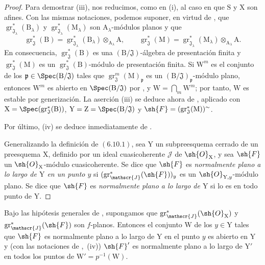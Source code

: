 \begin{proof}
Para demostrar (iii), nos reducimos, como en (i), al caso en que $\mathrm{S}$ y $\mathrm{X}$ son afines. Con las mismas notaciones, podemos suponer, en virtud de , que $\operatorname{gr}^*_{\mathfrak{J}_\lambda}(\mathrm{B}_\lambda)$ y $\operatorname{gr}^*_{\mathfrak{J}_\lambda}(\mathrm{M}_\lambda)$ son $\mathrm{A}_\lambda$-módulos planos y que
\[
\operatorname{gr}^*_\mathfrak{J}(\mathrm{B})
=\operatorname{gr}^*_{\mathfrak{J}_\lambda}(\mathrm{B}_\lambda)\otimes_{\mathrm{A}_\lambda}\mathrm{A},
\qquad
\operatorname{gr}^*_\mathfrak{J}(\mathrm{M})
=\operatorname{gr}^*_{\mathfrak{J}_\lambda}(\mathrm{M}_\lambda)\otimes_{\mathrm{A}_\lambda}\mathrm{A}.
\]
En consecuencia, $\operatorname{gr}^*_\mathfrak{J}(\mathrm{B})$ es una $(\mathrm{B}/\mathfrak{J})$-álgebra de presentación finita y $\operatorname{gr}^*_\mathfrak{J}(\mathrm{M})$ es un $\operatorname{gr}^*_\mathfrak{J}(\mathrm{B})$-módulo de presentación finita. Si $\mathrm{W}^m$ es el conjunto de los $\mathfrak{p}\in\Spec(\mathrm{B}/\mathfrak{J})$ tales que $\operatorname{gr}^m_\mathfrak{J}(\mathrm{M})_{\mathfrak{p}}$ es un $(\mathrm{B}/\mathfrak{J})_{\mathfrak{p}}$-módulo plano, entonces $\mathrm{W}^m$ es abierto en $\Spec(\mathrm{B}/\mathfrak{J})$ por , y $\mathrm{W}=\bigcap_m\mathrm{W}^m$; por tanto, $\mathrm{W}$ es estable por generización. La aserción (iii) se deduce ahora de , aplicado con $\mathrm{X}=\Spec(\operatorname{gr}^*_\mathfrak{J}(\mathrm{B}))$, $\mathrm{Y}=\mathrm{Z}=\Spec(\mathrm{B}/\mathfrak{J})$ y $\sh{F}=(\operatorname{gr}^*_\mathfrak{J}(\mathrm{M}))^\sim$.

Por último, (iv) se deduce inmediatamente de .

Generalizando la definición de $(6.10.1)$, sea $\mathrm{Y}$ un subpreesquema cerrado de un preesquema $\mathrm{X}$, definido por un ideal cuasicoherente $\mathscr{J}$ de $\sh{O}_\mathrm{X}$, y sea $\sh{F}$ un $\sh{O}_\mathrm{X}$-módulo cuasicoherente. Se dice que $\sh{F}$ es \emph{normalmente plano a lo largo de $\mathrm{Y}$ en un punto $y$} si $(\operatorname{gr}^*_\mathscr{J}(\sh{F}))_y$ es un $\sh{O}_{\mathrm{Y},y}$-módulo plano. Se dice que $\sh{F}$ es \emph{normalmente plano a lo largo de $\mathrm{Y}$} si lo es en todo punto de $\mathrm{Y}$.
\end{proof}

\begin{corollary}[11.3.5]
\label{IV.11.3.5}
Bajo las hipótesis generales de , supongamos que $\operatorname{gr}^*_\mathscr{J}(\sh{O}_\mathrm{X})$ y $\operatorname{gr}^*_\mathscr{J}(\sh{F})$ son $f$-planos. Entonces el conjunto $\mathrm{W}$ de los $y\in\mathrm{Y}$ tales que $\sh{F}$ es normalmente plano a lo largo de $\mathrm{Y}$ en el punto $y$ es abierto en $\mathrm{Y}$ y (con las notaciones de ,~(iv)) $\sh{F}'$ es normalmente plano a lo largo de $\mathrm{Y}'$ en todos los puntos de $\mathrm{W}'=p^{-1}(\mathrm{W})$.
\end{corollary}

